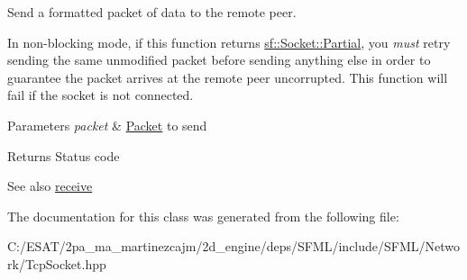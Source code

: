 Send a formatted packet of data to the remote peer. 

In non-\/blocking mode, if this function returns \hyperlink{classsf_1_1_socket_a51bf0fd51057b98a10fbb866246176dca181c163fad2eaea927185d127c392706}{sf\+::\+Socket\+::\+Partial}, you {\itshape must} retry sending the same unmodified packet before sending anything else in order to guarantee the packet arrives at the remote peer uncorrupted. This function will fail if the socket is not connected.


\begin{DoxyParams}{Parameters}
{\em packet} & \hyperlink{classsf_1_1_packet}{Packet} to send\\
\hline
\end{DoxyParams}
\begin{DoxyReturn}{Returns}
Status code
\end{DoxyReturn}
\begin{DoxySeeAlso}{See also}
\hyperlink{classsf_1_1_tcp_socket_a90ce50811ea61d4f00efc62bb99ae1af}{receive} 
\end{DoxySeeAlso}


The documentation for this class was generated from the following file\+:\begin{DoxyCompactItemize}
\item 
C\+:/\+E\+S\+A\+T/2pa\+\_\+ma\+\_\+martinezcajm/2d\+\_\+engine/deps/\+S\+F\+M\+L/include/\+S\+F\+M\+L/\+Network/Tcp\+Socket.\+hpp\end{DoxyCompactItemize}
